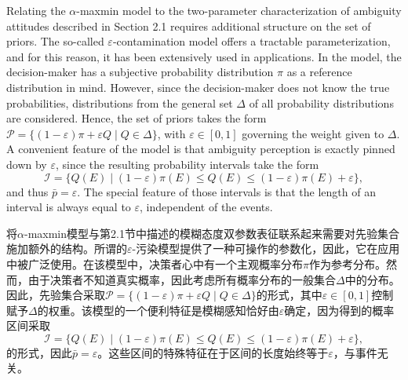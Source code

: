 \documentclass[12pt,a4paper]{article}
\newenvironment{original}
  {\par\medskip\noindent\color{black}\ignorespaces}
  {\par\medskip}
\newenvironment{translation}
  {\par\noindent\color{transblue}\ignorespaces}
  {\par\medskip\medskip}
\begin{document}
\begin{original}
Relating the $\alpha$-maxmin model to the two-parameter characterization of ambiguity attitudes described in Section 2.1 requires additional structure on the set of priors. The so-called $\varepsilon$-contamination model offers a tractable parameterization, and for this reason, it has been extensively used in applications. In the model, the decision-maker has a subjective probability distribution $\pi$ as a reference distribution in mind. However, since the decision-maker does not know the true probabilities, distributions from the general set $\Delta$ of all probability distributions are considered. Hence, the set of priors takes the form $\mathcal{P} = \{(1 - \varepsilon)\pi + \varepsilon Q \mid Q \in \Delta\}$, with $\varepsilon \in [0, 1]$ governing the weight given to $\Delta$. A convenient feature of the model is that ambiguity perception is exactly pinned down by $\varepsilon$, since the resulting probability intervals take the form
\begin{equation}
\mathcal{I} = \{Q(E) \mid (1 - \varepsilon)\pi(E) \leq Q(E) \leq (1 - \varepsilon)\pi(E) + \varepsilon\}, \label{eq:3}
\end{equation}
and thus $\bar{p} = \varepsilon$. The special feature of those intervals is that the length of an interval is always equal to $\varepsilon$, independent of the events.
\end{original}

\begin{translation}
将$\alpha$-maxmin模型与第2.1节中描述的模糊态度双参数表征联系起来需要对先验集合施加额外的结构。所谓的$\varepsilon$-污染模型提供了一种可操作的参数化，因此，它在应用中被广泛使用。在该模型中，决策者心中有一个主观概率分布$\pi$作为参考分布。然而，由于决策者不知道真实概率，因此考虑所有概率分布的一般集合$\Delta$中的分布。因此，先验集合采取$\mathcal{P} = \{(1 - \varepsilon)\pi + \varepsilon Q \mid Q \in \Delta\}$的形式，其中$\varepsilon \in [0, 1]$控制赋予$\Delta$的权重。该模型的一个便利特征是模糊感知恰好由$\varepsilon$确定，因为得到的概率区间采取
\begin{equation}
\mathcal{I} = \{Q(E) \mid (1 - \varepsilon)\pi(E) \leq Q(E) \leq (1 - \varepsilon)\pi(E) + \varepsilon\},
\end{equation}
的形式，因此$\bar{p} = \varepsilon$。这些区间的特殊特征在于区间的长度始终等于$\varepsilon$，与事件无关。
\end{translation}
\end{document}
